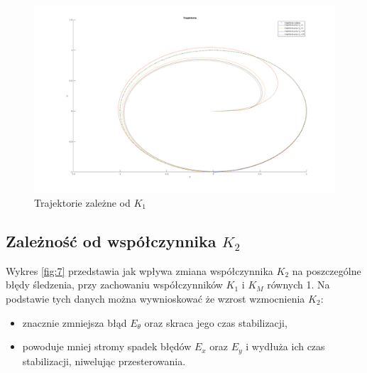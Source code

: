 \documentclass[12pt,a4paper]{article}
\begin{document}
  \begin{figure}[H]
    \centering
    \includegraphics[width=1\textwidth]{figures/dyn_trajektoria_k1.png}
    \caption{Trajektorie zależne od $K_1$}
    \label{fig:6}
  \end{figure}


  \subsection{Zależność od współczynnika $K_2$}
  Wykres \ref{fig:7} przedstawia jak wpływa zmiana współczynnika $K_2$ na poszczególne błędy śledzenia, przy zachowaniu współczynników $K_1$ i $K_M$ równych 1. Na podstawie tych danych można wywnioskować że wzrost wzmocnienia $K_2$:

  \begin{itemize}
    \item znacznie zmniejsza błąd $E_\theta$ oraz skraca jego czas stabilizacji,
    \item powoduje mniej stromy spadek błędów $E_x$ oraz $E_y$ i wydłuża ich czas stabilizacji, niwelując przesterowania.
  \end{itemize}
  
\end{document}

